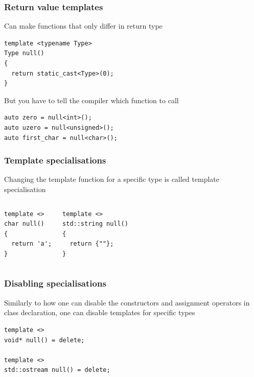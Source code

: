 \documentclass[14pt,a4paper,dvipsnames,usenames]{beamer}
\begin{document}
\begin{frame}[fragile]
  \frametitle{Return value templates}

  Can make functions that only differ in return type
  
  \vspace{.3em}
  \begin{lstlisting}[morekeywords={Type}]
template <typename Type>
Type null()
{
  return static_cast<Type>(0);
}
  \end{lstlisting}

  \vspace{.5em}
  But you have to tell the compiler which function to call

  \vspace{.3em}
  \begin{lstlisting}
auto zero = null<int>();
auto uzero = null<unsigned>();
auto first_char = null<char>();
  \end{lstlisting}
  
\end{frame}

\begin{frame}[fragile]
  \frametitle{Template specialisations}

  Changing the template function for a specific type is called template specialisation
  
  \vspace{.5em}
  \begin{columns}
  \begin{lstlisting}[morekeywords={string}]
template <>
char null()
{
  return 'a';
}
  \end{lstlisting}
  \begin{lstlisting}[morekeywords={string}]
template <>
std::string null()
{
  return {""};
}
  \end{lstlisting}
  \end{columns}
  
\end{frame}

\begin{frame}[fragile]
  \frametitle{Disabling specialisations}

  Similarly to how one can disable the constructors and assignment operators in class declaration,
  one can disable templates for specific types

  \vspace{.5em}
  \begin{lstlisting}[morekeywords={ostream}]
template <>
void* null() = delete;

template <>
std::ostream null() = delete;
  \end{lstlisting}

  \CPPEleven
  
\end{frame}
\end{document}
